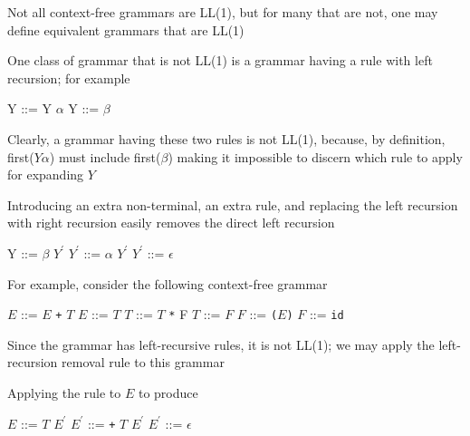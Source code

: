 \documentclass[8pt,a4paper,compress,handout]{beamer}
\newcommand{\mm}[1]{$#1$}
\newcommand{\expo}[2]{$#1^{#2}$}
\newenvironment{spaced}
{
\smallskip
\hspace{.5cm}
\begin{minipage}[c]{\textwidth}
}
{
\end{minipage}
\smallskip
}
\begin{document}
\begin{frame}[fragile]
\pause

Not all context-free grammars are LL(1), but for many that are not, one may define equivalent grammars that are LL(1)

\pause
\bigskip

One class of grammar that is not LL(1) is a grammar having a rule with left recursion; for example 

\text{ }
\begin{spaced}
\begin{production}
Y ::= Y \mm{\alpha}
Y ::= \mm{\beta}
\end{production}
\end{spaced}

\pause

Clearly, a grammar having these two rules is not LL(1), because, by definition, first($Y \alpha$) must include first($\beta$) making it impossible to discern which rule to apply for expanding $Y$

\pause
\bigskip

Introducing an extra non-terminal, an extra rule, and replacing the left recursion with right recursion easily removes the direct left recursion

\text{ }
\begin{spaced}
\begin{production}
Y  ::= \mm{\beta} \expo{Y}{\prime}
\expo{Y}{\prime} ::= \mm{\alpha} \expo{Y}{\prime}
\expo{Y}{\prime} ::= \mm{\epsilon}
\end{production}
\end{spaced}
\end{frame}

\begin{frame}[fragile]
\pause

For example, consider the following context-free grammar

\text{ }
\begin{spaced}
\begin{production}
\mm{E} ::= \mm{E} \lstinline{+} \mm{T}
\mm{E} ::= \mm{T}
\mm{T} ::= \mm{T} \lstinline{*} {F}
\mm{T} ::= \mm{F}
\mm{F} ::= \lstinline{(}\mm{E}\lstinline{)}
\mm{F} ::= \lstinline{id}
\end{production}
\end{spaced}

\pause

Since the grammar has left-recursive rules, it is not LL(1); we may apply the left-recursion removal rule to this grammar

\pause
\bigskip

Applying the rule to $E$ to produce

\text{ }
\begin{spaced}
\begin{production}
\mm{E}  ::= \mm{T} \expo{E}{\prime}
\expo{E}{\prime} ::= \lstinline{+} \mm{T} \expo{E}{\prime}
\expo{E}{\prime} ::= \mm{\epsilon}
\end{production}
\end{spaced}
\end{frame}
\end{document}
